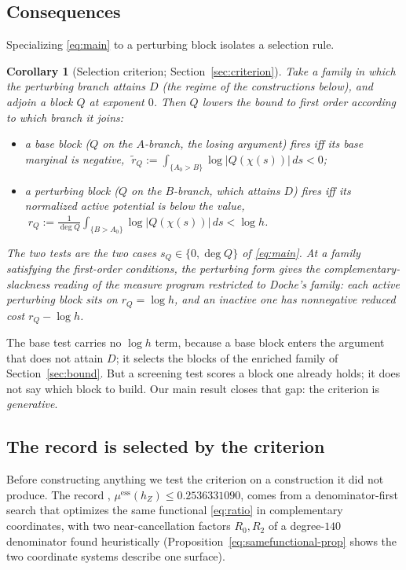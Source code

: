 \documentclass[11pt,reqno]{amsart}
\theoremstyle{plain}
\newtheorem{corollary}[theorem]{Corollary}
\theoremstyle{definition}
\newcommand{\hZ}{h_Z}
\newcommand{\essmin}{\mu^{\mathrm{ess}}(\hZ)}
\newcommand{\rQ}{r_Q}
\begin{document}
\subsection*{Consequences}
Specializing \eqref{eq:main} to a perturbing block isolates a selection rule.

\begin{corollary}[Selection criterion; Section~\ref{sec:criterion}]\label{cor:criterion}
Take a family in which the perturbing branch attains $D$ (the regime of the
constructions below), and adjoin a block $Q$ at exponent $0$. Then $Q$ lowers the
bound to first order according to which branch it joins:
\begin{itemize}
\item a \emph{base} block ($Q$ on the $A$-branch, the losing argument) fires iff its
  \emph{base marginal} is negative,
  $\;\widetilde r_Q:=\int_{\{A_0>B\}}\log|Q(\chi(s))|\,ds<0$;
\item a \emph{perturbing} block ($Q$ on the $B$-branch, which attains $D$) fires iff
  its \emph{normalized active potential} is below the value,
  $\;\rQ:=\frac1{\deg Q}\int_{\{B>A_0\}}\log|Q(\chi(s))|\,ds<\log h$.
\end{itemize}
The two tests are the two cases $s_Q\in\{0,\deg Q\}$ of \eqref{eq:main}. At a family
satisfying the first-order conditions, the perturbing form gives the
complementary-slackness reading of the \citet{BMQS} measure program restricted to
Doche's family: each active perturbing block sits on $\rQ=\log h$, and an inactive one
has nonnegative reduced cost $\rQ-\log h$.
\end{corollary}

The base test carries no $\log h$ term, because a base block enters the argument that
does not attain $D$; it selects the blocks of the enriched family of
Section~\ref{sec:bound}. But a screening test scores a block one already holds; it does
not say which block to build. Our main result closes that gap: the criterion is
\emph{generative}.

\subsection*{The record is selected by the criterion}
Before constructing anything we test the criterion on a construction it did not
produce. The record \citep{Gri26}, $\essmin\le0.2536331090$, comes from a
denominator-first search that optimizes the same functional \eqref{eq:ratio} in
complementary coordinates, with two near-cancellation factors $R_0,R_2$ of a
degree-$140$ denominator found heuristically (Proposition~\ref{eq:samefunctional-prop}
shows the two coordinate systems describe one surface).
\end{document}

